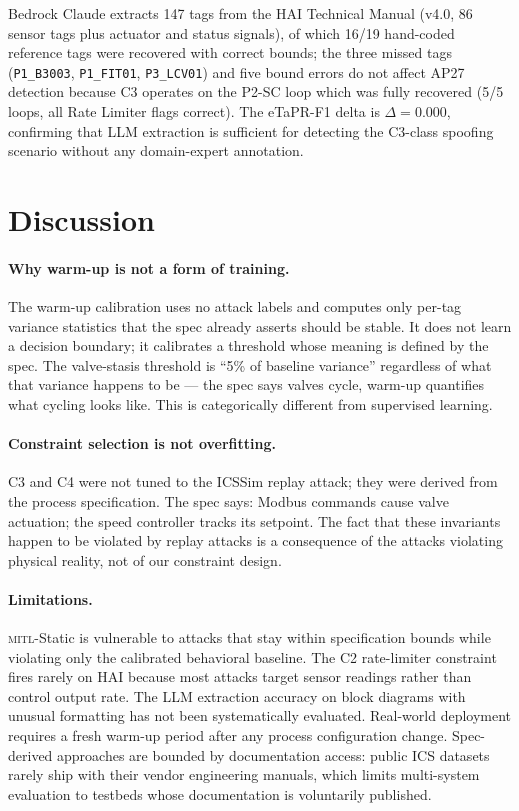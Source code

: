 \documentclass[sigconf,anonymous,review]{acmart}
\newcommand{\mitl}{\textsc{mitl}\xspace}
\begin{document}
Bedrock Claude extracts 147 tags from the HAI Technical Manual (v4.0, 86 sensor tags
plus actuator and status signals), of which 16/19 hand-coded reference tags were
recovered with correct bounds; the three missed tags (\texttt{P1\_B3003},
\texttt{P1\_FIT01}, \texttt{P3\_LCV01}) and five bound errors do not affect AP27
detection because C3 operates on the P2-SC loop which was fully recovered (5/5 loops,
all Rate Limiter flags correct).  The eTaPR-F1 delta is $\Delta = 0.000$,
confirming that LLM extraction is sufficient for detecting the C3-class spoofing
scenario without any domain-expert annotation.

\section{Discussion}
\label{sec:discussion}

\paragraph{Why warm-up is not a form of training.}
The warm-up calibration uses no attack labels and computes only per-tag
variance statistics that the spec already asserts should be stable.  It does
not learn a decision boundary; it calibrates a threshold whose meaning is
defined by the spec.  The valve-stasis threshold is ``5\% of baseline
variance'' regardless of what that variance happens to be — the spec says
valves cycle, warm-up quantifies what cycling looks like.  This is
categorically different from supervised learning.

\paragraph{Constraint selection is not overfitting.}
C3 and C4 were not tuned to the ICSSim replay attack; they were derived from
the process specification.  The spec says: Modbus commands cause valve
actuation; the speed controller tracks its setpoint.  The fact that these
invariants happen to be violated by replay attacks is a consequence of the
attacks violating physical reality, not of our constraint design.

\paragraph{Limitations.}
\mitl-Static is vulnerable to attacks that stay within specification bounds
while violating only the calibrated behavioral baseline.  The C2 rate-limiter
constraint fires rarely on HAI because most attacks target sensor readings
rather than control output rate.  The LLM extraction accuracy on block
diagrams with unusual formatting has not been systematically evaluated.
Real-world deployment requires a fresh warm-up period after any process
configuration change.  Spec-derived approaches are bounded by documentation
access: public ICS datasets rarely ship with their vendor engineering manuals,
which limits multi-system evaluation to testbeds whose documentation is
voluntarily published.
\end{document}
